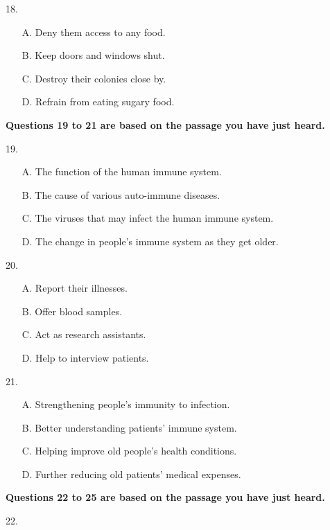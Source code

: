 \documentclass[UTF8,11pt]{ctexart}
\begin{document}
18.


\begin{itemize}[leftmargin=2em,itemsep=.2em,topsep=.4em]\item[A.] Deny them access to any food.
\item[B.] Keep doors and windows shut.
\item[C.] Destroy their colonies close by.
\item[D.] Refrain from eating sugary food.
\end{itemize}

\textbf{Questions 19 to 21 are based on the passage you have just heard.}


19.


\begin{itemize}[leftmargin=2em,itemsep=.2em,topsep=.4em]\item[A.] The function of the human immune system.
\item[B.] The cause of various auto-immune diseases.
\item[C.] The viruses that may infect the human immune system.
\item[D.] The change in people’s immune system as they get older.
\end{itemize}

20.


\begin{itemize}[leftmargin=2em,itemsep=.2em,topsep=.4em]\item[A.] Report their illnesses.
\item[B.] Offer blood samples.
\item[C.] Act as research assistants.
\item[D.] Help to interview patients.
\end{itemize}

21.


\begin{itemize}[leftmargin=2em,itemsep=.2em,topsep=.4em]\item[A.] Strengthening people’s immunity to infection.
\item[B.] Better understanding patients’ immune system.
\item[C.] Helping improve old people’s health conditions.
\item[D.] Further reducing old patients’ medical expenses.
\end{itemize}

\textbf{Questions 22 to 25 are based on the passage you have just heard.}


22.
\end{document}
